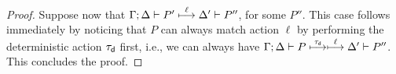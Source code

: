 \begin{proof}
Suppose now  that 
$\Gamma; \Delta \vdash P' \stackrel{\ell}{\longmapsto} \Delta' \vdash P''$, for some $P''$.
This case follows immediately by noticing that $P$ can always match action $\ell$ by performing the deterministic action $\tau_{\mathsf{d}}$ first, i.e., we can always have
$\Gamma; \Delta \vdash P \stackrel{\tau_{\mathsf{d}}}{\longmapsto}\stackrel{\ell}{\longmapsto} \Delta' \vdash P''$.
This concludes the proof.
%
%
%
%
%
%
%	
%

\end{proof}
